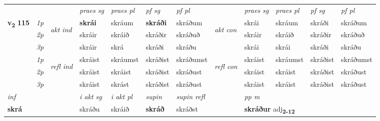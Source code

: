 \begin{longtable}[l]{X>{\footnotesize\itshape}llXXXXlXXXX}
 & &   & \textit{praes sg}  & \textit{praes pl}    & \textit{ pf sg} & \textit{pf pl} & & \textit{praes sg}  & \textit{praes pl}    & \textit{pf sg} & \textit{pf pl }  \\ \cmidrule{4-7} \cmidrule{9-12}
 \multirow{2}{*}{{{\textbf{v{\textsubscript{2}}} \Large{\textbf{115}}}}}  & 1p & \multirow{3}{*}{\begin{turn}{90}\textit{akt ind}\end{turn}} & \textbf{skrái} & skráum & \textbf{skráði} & skráðum & \multirow{3}{*}{\begin{turn}{90}\textit{akt con}\end{turn}} &skrái & skráum & skráði & skráðum\\*
 & 2p &  &  skráir  & skráið & skráðir & skráðuð & & skráir & skráið & skráðir & skráðuð \\*
 & 3p &  & skráir & skrá & skráði & skráðu & & skrái & skrái& skráði & skráðu \\*
\cmidrule{4-7} \cmidrule{9-12}
 & 1p & \multirow{3}{*}{\begin{turn}{90}\textit{refl ind}\end{turn}}  & skráist & skráumst & skráðist & skráðumst & \multirow{3}{*}{\begin{turn}{90}\textit{refl con}\end{turn}}  &skráist & skráumst & skráðist & skráðumst \\*
 & 2p &  & skráist & skráist & skráðist & skráðust & &skráist & skráist & skráðist & skráðust \\*
 & 3p  & & skráist & skrást & skráðist & skráðust & & skráist & skráist& skráðist & skráðust \\*
\cmidrule{4-7} \cmidrule{9-12}

   {\textit{inf}} & &  & \textit{i akt sg} & \textit{i akt pl}    & \textit{supin} & \textit{supin refl} && \textit{pp m} \\*
  {\textbf{skrá}} & && skráðu  & skráið    &  \textbf{skráð} & skráðst && \multicolumn{2}{l}{\textbf{skráður} adj\textbf{\textsubscript{2-12}}} \\*

\midrule


\end{longtable}
